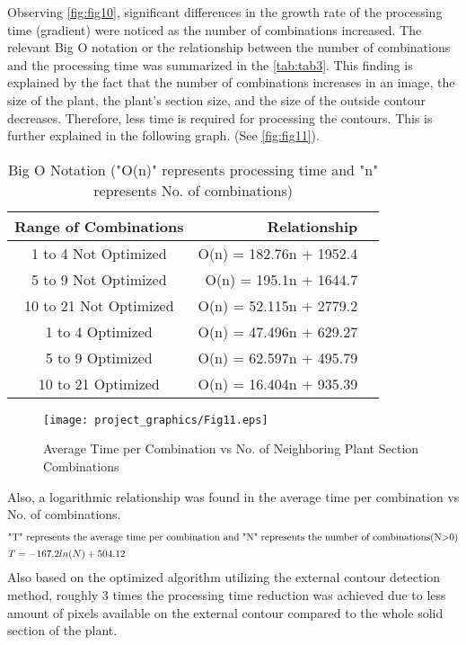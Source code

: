 \documentclass[]{iat}
\begin{document}
Observing \autoref{fig:fig10}, significant differences in the growth rate of the processing time (gradient) were noticed as the number of combinations increased. The relevant Big O notation or the relationship between the number of combinations and the processing time was summarized in the \autoref{tab:tab3}. This finding is explained by the fact that the number of combinations increases in an image, the size of the plant, the plant's section size, and the size of the outside contour decreases. Therefore, less time is required for processing the contours. This is further explained in the following graph. (See \autoref{fig:fig11}). 
\par
\FloatBarrier
\begin{table}[h]
\begin{tabular}{crl}
\hline
Range of Combinations & Relationship\\\hline
1 to 4 Not Optimized & O(n) = 182.76n + 1952.4 \\
5 to 9 Not Optimized & O(n) = 195.1n + 1644.7 \\
10 to 21 Not Optimized & O(n) = 52.115n + 2779.2 \\
1 to 4 Optimized & O(n) = 47.496n + 629.27 \\
5 to 9 Optimized & O(n) = 62.597n + 495.79 \\
10 to 21 Optimized & O(n) = 16.404n + 935.39 \\\hline
\end{tabular}
\caption{Big O Notation ("O(n)" represents processing time and "n" represents No. of combinations)}
\label{tab:tab3}
\end{table}
\par
\FloatBarrier
\begin{figure}[h]
	\texttt{[image: project\_graphics/Fig11.eps]}
	\caption{Average Time per Combination vs No. of Neighboring Plant Section Combinations }
	\label{fig:fig11}
\end{figure}
Also, a logarithmic relationship was found in the average time per combination vs No. of combinations. 
\FloatBarrier
\begin{align}
\intertext{"T" represents the average time per combination and "N" represents the number of combinations(N>0)}
T &=-167.2ln(N)+504.12
\end{align}
Also based on the optimized algorithm utilizing the external contour detection method, roughly 3 times the processing time reduction was achieved due to less amount of pixels available on the external contour compared to the whole solid section of the plant.
\end{document}
